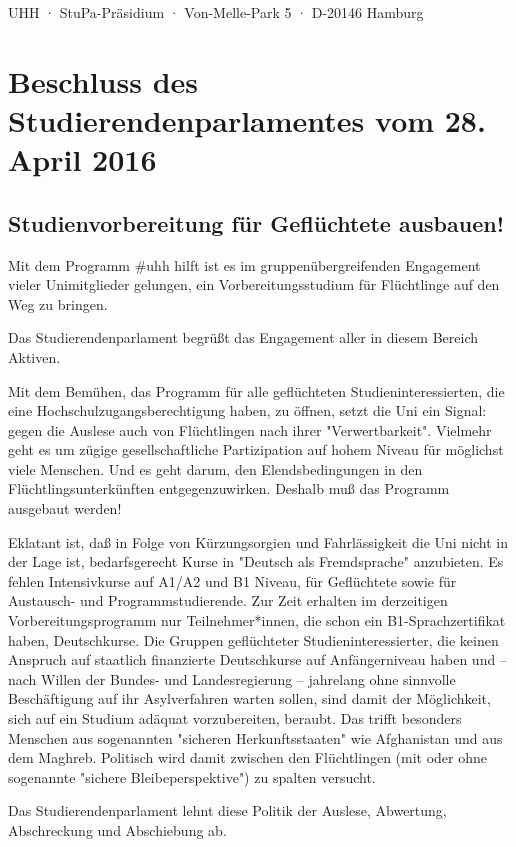 \documentclass[ngerman,headheight=70pt]{scrartcl}
\begin{document}
    UHH · StuPa-Präsidium · Von-Melle-Park 5 · D-20146 Hamburg

    \section*{Beschluss des Studierendenparlamentes vom 28. April 2016}
    \subsection*{Studienvorbereitung für Geflüchtete ausbauen!}

    Mit dem Programm \#uhh hilft ist es im gruppenübergreifenden Engagement vieler
    Unimitglieder gelungen, ein Vorbereitungsstudium für Flüchtlinge auf den Weg
    zu bringen.

    Das Studierendenparlament begrüßt das Engagement aller in diesem Bereich Aktiven.

    Mit dem Bemühen, das Programm für alle geflüchteten Studieninteressierten,
    die eine Hochschulzugangsberechtigung haben, zu öffnen, setzt die Uni ein
    Signal: gegen die Auslese auch von Flüchtlingen nach ihrer "Verwertbarkeit".
    Vielmehr geht es um zügige gesellschaftliche Partizipation auf hohem Niveau
    für möglichst viele Menschen. Und es geht darum, den Elendsbedingungen in den
    Flüchtlingsunterkünften entgegenzuwirken. Deshalb muß das Programm ausgebaut
    werden!

    Eklatant ist, daß in Folge von Kürzungsorgien und Fahrlässigkeit die Uni
    nicht in der Lage ist, bedarfsgerecht Kurse in "Deutsch als Fremdsprache"
    anzubieten. Es fehlen Intensivkurse auf A1/A2 und B1 Niveau, für Geflüchtete
    sowie für Austausch- und Programmstudierende. Zur Zeit erhalten im derzeitigen
    Vorbereitungsprogramm nur Teilnehmer*innen, die schon ein B1-Sprachzertifikat
    haben, Deutschkurse. Die Gruppen geflüchteter Studieninteressierter, die keinen
    Anspruch auf staatlich finanzierte Deutschkurse auf Anfängerniveau haben und
    -- nach Willen der Bundes- und Landesregierung -- jahrelang ohne sinnvolle
    Beschäftigung auf ihr Asylverfahren warten sollen, sind damit der Möglichkeit,
    sich auf ein Studium adäquat vorzubereiten, beraubt. Das trifft besonders
    Menschen aus sogenannten "sicheren Herkunftsstaaten" wie Afghanistan und aus
    dem Maghreb. Politisch wird damit zwischen den Flüchtlingen (mit oder ohne
    sogenannte "sichere Bleibeperspektive") zu spalten versucht.


    Das Studierendenparlament lehnt diese Politik der Auslese, Abwertung,
    Abschreckung und Abschiebung ab.
\end{document}

